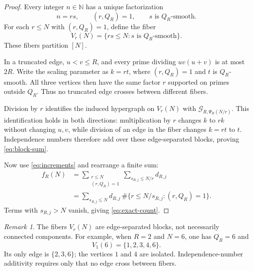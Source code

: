 \documentclass[11pt]{article}
\theoremstyle{definition}
\theoremstyle{remark}
\newtheorem{remark}[theorem]{Remark}
\numberwithin{equation}{section}
\newcommand{\N}{\mathbb N}
\begin{document}
\begin{proof}
Every integer \(n\in\N\) has a unique factorization
\[
 n=rs,\qquad (r,Q_R)=1,\qquad s\text{ is }Q_R\text{-smooth}.
\]
For each \(r\le N\) with \((r,Q_R)=1\), define the fiber
\[
 V_r(N)=\{rs\le N:s\text{ is }Q_R\text{-smooth}\}.
\]
These fibers partition \([N]\).

In a truncated edge, \(u<v\le R\), and every prime dividing
\(uv(u+v)\) is at most \(2R\). Write the scaling parameter as
\(k=rt\), where \((r,Q_R)=1\) and \(t\) is \(Q_R\)-smooth.
All three vertices then have the same factor \(r\) supported on
primes outside \(Q_R\). Thus no truncated edge crosses between
different fibers.

Division by \(r\) identifies the induced hypergraph on \(V_r(N)\)
with \(\mathcal G_{R,\Psi_R(N/r)}\). This identification holds in
both directions: multiplication by \(r\) changes \(k\) to \(rk\)
without changing \(u,v\), while division of an edge in the fiber
changes \(k=rt\) to \(t\). Independence numbers therefore add
over these edge-separated blocks, proving \eqref{eq:block-sum}.

Now use \eqref{eq:increments} and rearrange a finite sum:
\begin{align*}
 f_R(N)
 &=\sum_{\substack{r\le N\\(r,Q_R)=1}}
       \sum_{s_{R,j}\le N/r}d_{R,j}\\
 &=\sum_{s_{R,j}\le N}
       d_{R,j}\,\#\{r\le N/s_{R,j}:(r,Q_R)=1\}.
\end{align*}
Terms with \(s_{R,j}>N\) vanish, giving \eqref{eq:exact-count}.
\end{proof}

\begin{remark}\label{rem:not-components}
The fibers \(V_r(N)\) are edge-separated blocks, not necessarily
connected components. For example, when \(R=2\) and \(N=6\),
one has \(Q_R=6\) and
\[
 V_1(6)=\{1,2,3,4,6\}.
\]
Its only edge is \(\{2,3,6\}\); the vertices \(1\) and \(4\) are
isolated. Independence-number additivity requires only that no
edge cross between fibers.
\end{remark}
\end{document}
